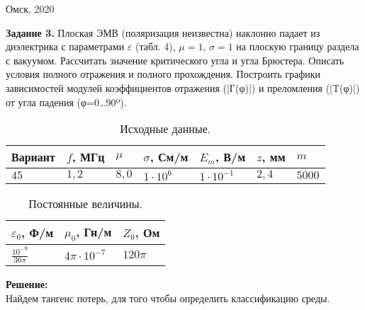 \documentclass[14pt,a4paper]{scrartcl}
\begin{document}
\begin{titlepage}
    \vspace{\fill}                                                    
                                                                                        
    \begin{center}                                                        
    Омск, 2020                                                                
    \end{center}                                                          
                                                                                        
    \end{titlepage}

    \newpage
    {\bfseries Задание 3.} Плоская ЭМВ (поляризация неизвестна) наклонно падает из диэлектрика с параметрами $ \varepsilon $ (табл. 4), $\mu=1$, $\sigma=1$ на плоскую границу раздела с вакуумом.
    Рассчитать значение критического угла и угла Брюстера. Описать условия полного отражения и полного прохождения.
    Построить графики зависимостей модулей коэффициентов отражения (|Г(φ)|) и преломления (|T(φ)|) от угла падения (φ=0…90º).    

    \begin{table}[h!]
      \begin{center}
        \label{tab:table1}
        \begin{tabular}{|l|l|l|l|l|l|l|}
          \hline
          Вариант & $f$, МГц & $\mu$ & $\sigma$, См/м & $E_m$, В/м & $z$, мм & $m$ \\
          \hline
          $45$ & $1,2$ & $8,0$ & $1\cdot{10}^{6}$ & $1\cdot{10}^{-1}$ & $2,4$ & $5000$ \\
          \hline
        \end{tabular}
        \caption{Исходные данные.}
      \end{center}
    \end{table}

    \begin{table}[h!]
      \begin{center}
        \label{tab:table2}
        \begin{tabular}{|l|l|l|}
          \hline
          $\varepsilon_0$, Ф/м & $\mu_0$, Гн/м & $Z_0$, Ом \\
          \hline
          $\frac{{10}^{-9}}{36\pi}$ & $4\pi\cdot10^{-7}$ & $120\pi$ \\
          \hline
        \end{tabular}
        \caption{Постоянные величины.}
      \end{center}
    \end{table}
    {\bfseries Решение:} \\
    \indent Найдем тангенс потерь, для того чтобы определить классификацию среды.
\end{document}
